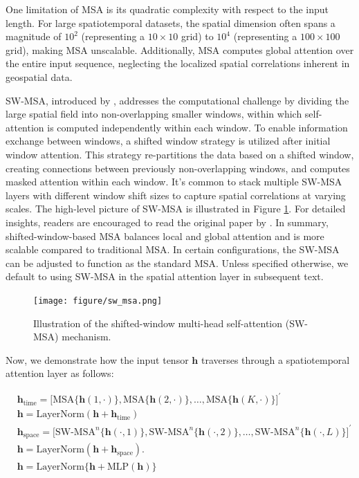\documentclass[11pt]{article}
\begin{document}
One limitation of MSA is its quadratic complexity with respect to the input length. For large spatiotemporal datasets, the spatial dimension often spans a magnitude of $10^2$ (representing a $10\times 10$ grid) to $10^4$ (representing a $100 \times 100$ grid), making MSA unscalable. Additionally, MSA computes global attention over the entire input sequence, neglecting the localized spatial correlations inherent in geospatial data. 

SW-MSA, introduced by \citet{liu2021swin}, addresses the computational challenge by dividing the large spatial field into non-overlapping smaller windows, within which self-attention is computed independently within each window. To enable information exchange between windows, a shifted window strategy is utilized after initial window attention. This strategy re-partitions the data based on a shifted window, creating connections between previously non-overlapping windows, and computes masked attention within each window. It's common to stack multiple SW-MSA layers with different window shift sizes to capture spatial correlations at varying scales. The high-level picture of SW-MSA is illustrated in Figure \ref{fig: sw_msa}. For detailed insights, readers are encouraged to read the original paper by \citet{liu2021swin}. In summary, shifted-window-based MSA balances local and global attention and is more scalable compared to traditional MSA. In certain configurations, the SW-MSA can be adjusted to function as the standard MSA. Unless specified otherwise, we default to using SW-MSA in the spatial attention layer in subsequent text.



\begin{figure}
\centering
\texttt{[image: figure/sw\_msa.png]}
\caption{Illustration of the shifted-window multi-head self-attention (SW-MSA) mechanism.}
\label{fig: sw_msa}
\end{figure}




Now, we demonstrate how the input tensor $\boldsymbol{h}$ traverses through a spatiotemporal attention layer as follows:



\begin{align}
		&\boldsymbol{h}_{\text{time}} = \big[\text{MSA}\{\boldsymbol{h}(1,\cdot)\}, \text{MSA}\{\boldsymbol{h}(2,\cdot)\}, \ldots, \text{MSA}\{\boldsymbol{h}(K,\cdot)\}\big]^{\prime}\\
		&\boldsymbol{h}= \text{LayerNorm}(\boldsymbol{h}+ \boldsymbol{h}_{\text{time}})\\
		&\boldsymbol{h}_{\text{space}} = \big[\text{SW-MSA}^n\{\boldsymbol{h}(\cdot, 1)\}, \text{SW-MSA}^n\{\boldsymbol{h}(\cdot, 2)\}, \ldots, \text{SW-MSA}^n\{\boldsymbol{h}(\cdot, L)\}\big]^{\prime}\\
		&\boldsymbol{h}= \text{LayerNorm}(\boldsymbol{h}+ \boldsymbol{h}_{\text{space}}).\\
		& \boldsymbol{h} = \text{LayerNorm}\{\boldsymbol{h} + \text{MLP}(\boldsymbol{h})\}
\end{align}
\end{document}
